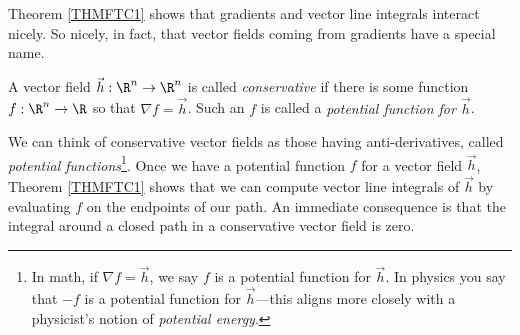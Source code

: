 Theorem \ref{THMFTC1} shows that gradients and vector line integrals
interact nicely.  So nicely, in fact, that vector fields coming 
from gradients have a special name.

\begin{definition}
	A vector field $\vec h:\R^n\to\R^n$ is called \emph{conservative}
	if there is some function $f:\R^n\to\R$ so that $\nabla f=\vec h$.
	Such an $f$ is called a \emph{potential function for $\vec h$}.
\end{definition}

We can think of conservative vector fields
as those having anti-derivatives,
called \emph{potential functions}\footnote{
In math, if $\nabla f=\vec h$, we say $f$ is a potential function for $\vec h$.
In physics you say that $-f$ is a potential function for $\vec h$---this aligns
more closely with a physicist's notion of \emph{potential energy}.}.  Once
we have a potential function $f$ for a vector field $\vec h$, 
Theorem \ref{THMFTC1} shows that we can compute vector line integrals
of $\vec h$ by evaluating $f$ on the endpoints of our path.  An immediate consequence
is that the integral around a closed path in a conservative vector field is
zero.

